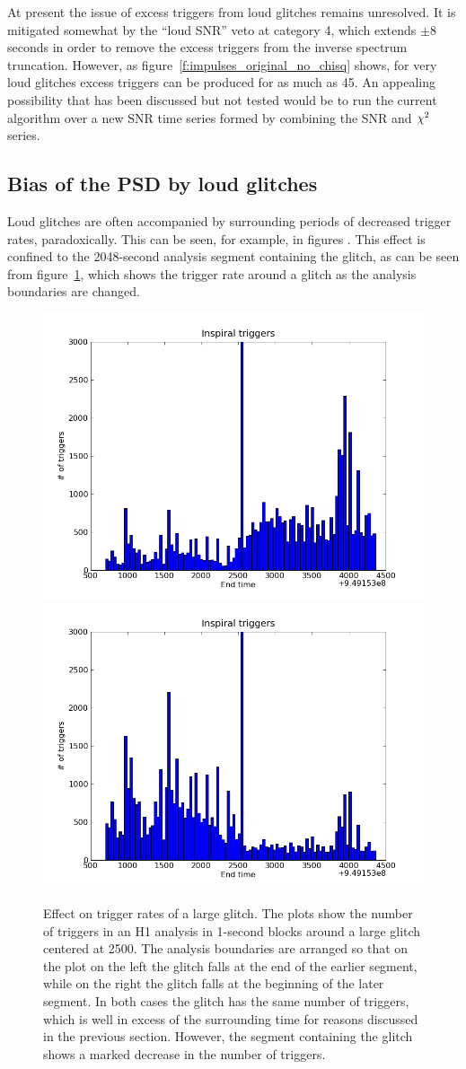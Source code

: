 At present the issue of excess triggers from loud glitches remains
unresolved.  It is mitigated somewhat by the ``loud SNR'' veto at
category 4, which extends $\pm 8$ seconds in order to remove the
excess triggers from the inverse spectrum truncation.  However, as
figure~\ref{f:impulses_original_no_chisq} shows, for very loud
glitches excess triggers can be produced for as much as 45.  An
appealing possibility that has been discussed but not tested would be
to run the current algorithm over a new SNR time series formed by
combining the SNR and $\chi^2$ series.

\subsection{Bias of the PSD by loud glitches}
\label{ssec:sarlacc}

Loud glitches are often accompanied by surrounding periods of
decreased trigger rates, paradoxically.  This can be seen, for
example, in figures .  This effect is confined to the
2048-second analysis segment containing the glitch, as can be seen from
figure~\ref{f:move_glitch}, which shows the trigger rate around a
glitch as the analysis boundaries are changed.

\begin{figure}
  \includegraphics[width=0.5\linewidth]{figures/detchar/H1-endtime_hist_ORIG}
  \includegraphics[width=0.5\linewidth]{figures/detchar/H1-endtime_hist_RESEG}
  \caption[Effect on trigger rates of a large glitch] {
  \label{f:move_glitch}
Effect on trigger rates of a large glitch.  The plots show the number
of triggers in an H1 analysis in 1-second blocks around a large glitch
centered at 2500.  The analysis boundaries are arranged so that on the
plot on the left the glitch falls at the end of the earlier segment,
while on the right the glitch falls at the beginning of the later
segment.  In both cases the glitch has the same number of triggers, 
which is well in excess of the surrounding time for reasons discussed
in the previous section.  However, the segment containing the glitch
shows a marked decrease in the number of triggers.
}
\end{figure}%

